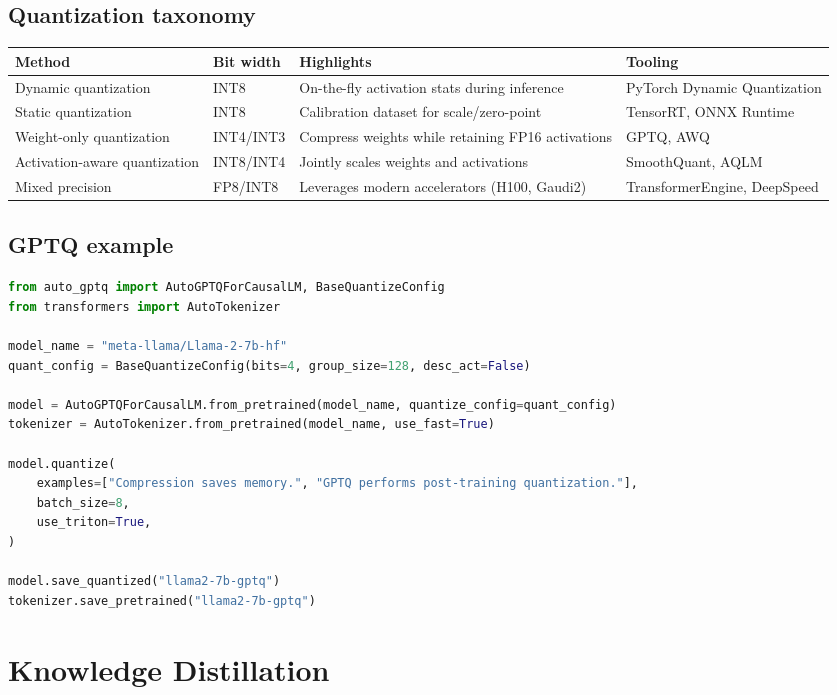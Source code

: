 \documentclass{article}
\begin{document}
\subsection{Quantization taxonomy}
\begin{longtable}{p{3cm}p{3cm}p{4cm}p{4cm}}
\toprule
Method & Bit width & Highlights & Tooling \\
\midrule
Dynamic quantization & INT8 & On-the-fly activation stats during inference & PyTorch Dynamic Quantization \\
Static quantization & INT8 & Calibration dataset for scale/zero-point & TensorRT, ONNX Runtime \\
Weight-only quantization & INT4/INT3 & Compress weights while retaining FP16 activations & GPTQ, AWQ \\
Activation-aware quantization & INT8/INT4 & Jointly scales weights and activations & SmoothQuant, AQLM \\
Mixed precision & FP8/INT8 & Leverages modern accelerators (H100, Gaudi2) & TransformerEngine, DeepSpeed \\
\bottomrule
\end{longtable}

\subsection{GPTQ example}
\begin{lstlisting}[language=Python,caption={Applying GPTQ to quantize LLaMA weights}]
from auto_gptq import AutoGPTQForCausalLM, BaseQuantizeConfig
from transformers import AutoTokenizer

model_name = "meta-llama/Llama-2-7b-hf"
quant_config = BaseQuantizeConfig(bits=4, group_size=128, desc_act=False)

model = AutoGPTQForCausalLM.from_pretrained(model_name, quantize_config=quant_config)
tokenizer = AutoTokenizer.from_pretrained(model_name, use_fast=True)

model.quantize(
    examples=["Compression saves memory.", "GPTQ performs post-training quantization."],
    batch_size=8,
    use_triton=True,
)

model.save_quantized("llama2-7b-gptq")
tokenizer.save_pretrained("llama2-7b-gptq")
\end{lstlisting}

\section{Knowledge Distillation}
\end{document}
